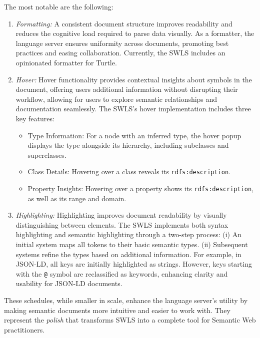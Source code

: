 The most notable are the following:
\begin{enumerate}
  \item \textit{Formatting:}
    A consistent document structure improves readability and reduces the cognitive load required to parse data visually.
    As a formatter, the language server ensures uniformity across documents, promoting best practices and easing collaboration.
    Currently, the SWLS includes an opinionated formatter for Turtle.

  \item \textit{Hover:}
    Hover functionality provides contextual insights about symbols in the document, offering users additional information without disrupting their workflow,
    allowing for users to explore semantic relationships and documentation seamlessly.
    The SWLS’s hover implementation includes three key features:
    \begin{itemize}
      \item Type Information: For a node with an inferred type, the hover popup displays the type alongside its hierarchy, including subclasses and superclasses.
      \item Class Details: Hovering over a class reveals its \texttt{rdfs:description}.
      \item Property Insights: Hovering over a property shows its \texttt{rdfs:description}, as well as its range and domain.
    \end{itemize}

  \item \textit{Highlighting:}
    Highlighting improves document readability by visually distinguishing between elements.
    The SWLS implements both syntax highlighting and semantic highlighting through a two-step process:
        (i) An initial system maps all tokens to their basic semantic types.
        (ii) Subsequent systems refine the types based on additional information.
    For example, in JSON-LD, all keys are initially highlighted as strings.
    However, keys starting with the \texttt{@} symbol are reclassified as keywords, enhancing clarity and usability for JSON-LD documents.
\end{enumerate}

These schedules, while smaller in scale, enhance the language server’s utility by making semantic documents more intuitive and easier to work with.
They represent the \textit{polish} that transforms SWLS into a complete tool for Semantic Web practitioners.
